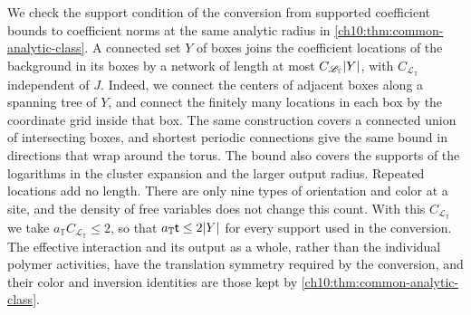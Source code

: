 We check the support condition of the conversion from supported coefficient bounds to coefficient norms at the same analytic radius in \cref{ch10:thm:common-analytic-class}. A connected set $Y$ of boxes joins the coefficient locations of the background in its boxes by a network of length at most $C_{\mathscr L_{\mathbb T}}\lvert Y\rvert$, with $C_{\mathscr L_{\mathbb T}}$ independent of $J$. Indeed, we connect the centers of adjacent boxes along a spanning tree of $Y$, and connect the finitely many locations in each box by the coordinate grid inside that box. The same construction covers a connected union of intersecting boxes, and shortest periodic connections give the same bound in directions that wrap around the torus. The bound also covers the supports of the logarithms in the cluster expansion and the larger output radius. Repeated locations add no length. There are only nine types of orientation and color at a site, and the density of free variables does not change this count. With this $C_{\mathscr L_{\mathbb T}}$ we take $a_{\mathbb T}C_{\mathscr L_{\mathbb T}}\le2$, so that $a_{\mathbb T}\mathsf t\le2\lvert Y\rvert$ for every support used in the conversion. The effective interaction and its output as a whole, rather than the individual polymer activities, have the translation symmetry required by the conversion, and their color and inversion identities are those kept by \cref{ch10:thm:common-analytic-class}.

